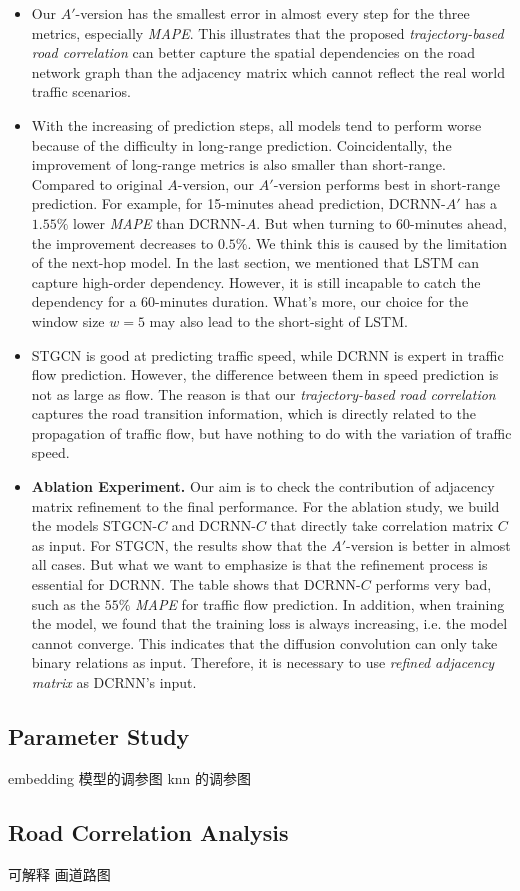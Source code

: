 \begin{table}[htb]
\begin{center}
{\begin{tabular}{c|c|ccc|ccc|ccc}
                \bottomrule
            \end{tabular}
        }
    \end{center}
\end{table}

\begin{itemize}
    \item Our $A'$-version has the smallest error in almost every step for the three metrics, especially \textit{MAPE}. This illustrates that the proposed \textit{trajectory-based road correlation} can better capture the spatial dependencies on the road network graph than the adjacency matrix which cannot reflect the real world traffic scenarios.
    \item With the increasing of prediction steps, all models tend to perform worse because of the difficulty in long-range prediction. Coincidentally, the improvement of long-range metrics is also smaller than short-range. Compared to original $A$-version, our $A'$-version performs best in short-range prediction. For example, for 15-minutes ahead prediction, DCRNN-$A'$ has a $1.55\%$ lower \textit{MAPE} than DCRNN-$A$. But when turning to 60-minutes ahead, the improvement decreases to $0.5\%$. We think this is caused by the limitation of the next-hop model. In the last section, we mentioned that LSTM can capture high-order dependency. However, it is still incapable to catch the dependency for a 60-minutes duration. What's more, our choice for the window size $w=5$ may also lead to the short-sight of LSTM.
    \item STGCN is good at predicting traffic speed, while DCRNN is expert in traffic flow prediction. However, the difference between them in speed prediction is not as large as flow. The reason is that our \textit{trajectory-based road correlation} captures the road transition information, which is directly related to the propagation of traffic flow, but have nothing to do with the variation of traffic speed.
    \item \textbf{Ablation Experiment.} Our aim is to check the contribution of adjacency matrix refinement to the final performance. For the ablation study, we build the models STGCN-$C$ and DCRNN-$C$ that directly take correlation matrix $C$ as input. For STGCN, the results show that the $A'$-version is better in almost all cases. But what we want to emphasize is that the refinement process is essential for DCRNN. The table shows that DCRNN-$C$ performs very bad, such as the $55\%$ \textit{MAPE} for traffic flow prediction. In addition, when training the model, we found that the training loss is always increasing, i.e. the model cannot converge. This indicates that the diffusion convolution can only take binary relations as input. Therefore, it is necessary to use \textit{refined adjacency matrix} as DCRNN's input.
\end{itemize}

\subsection{Parameter Study}
embedding 模型的调参图
knn 的调参图

\subsection{Road Correlation Analysis}
可解释
画道路图
